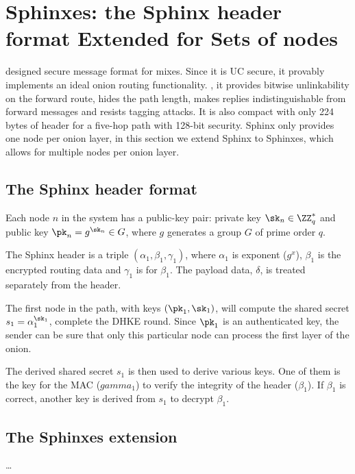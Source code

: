\section{Sphinxes: the Sphinx header format Extended for Sets of nodes}%
\label{Sphinxes}

\Textcite{Sphinx} designed  secure message format for mixes.
Since it is \ac{UC} secure, it provably implements an ideal onion routing 
functionality.
\Ie, it provides bitwise unlinkability on the forward route, hides the path 
length, makes replies indistinguishable from forward messages and resists 
tagging attacks.
It is also compact with only 224 bytes of header for a five-hop path with 
128-bit security.
Sphinx only provides one node per onion layer, in this section we extend Sphinx 
to Sphinxes, which allows for multiple nodes per onion layer.

\subsection{The Sphinx header format}


Each node \(n\) in the system has a public-key pair: private key \(\sk_n\in 
  \ZZ_q^*\) and public key \(\pk_n = g^{\sk_n}\in G\), where \(g\) generates a 
group \(G\) of prime order \(q\).

The Sphinx header is a triple \((\alpha_1, \beta_1, \gamma_1)\), where 
\(\alpha_1\) is  exponent (\(g^x\)), \(\beta_1\) is the encrypted 
routing data and \(\gamma_1\) is  for \(\beta_1\).
The payload data, \(\delta\), is treated separately from the header.

The first node in the path, with keys \((\pk_1, \sk_1)\), will compute the 
shared secret \(s_1 = \alpha_1^{\sk_1}\), \ie complete the \ac{DHKE} round.
Since \(\pk_1\) is an authenticated key, the sender can be sure that only this 
particular node can process the first layer of the onion.

The derived shared secret \(s_1\) is then used to derive various keys.
One of them is the key for the \ac{MAC} (\(gamma_1\)) to verify the integrity 
of the header (\(\beta_1\)).
If \(\beta_1\) is correct, another key is derived from \(s_1\) to decrypt 
\(\beta_1\).

\subsection{The Sphinxes extension}

\dots

